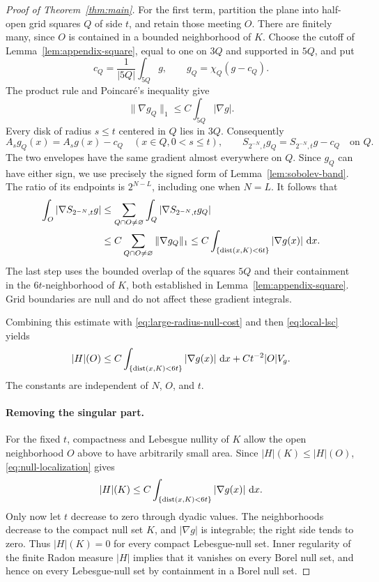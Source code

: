 \begin{proof}[Proof of Theorem~\ref{thm:main}]
For the first term, partition the plane into half-open grid squares
$Q$ of side $t$, and retain those meeting $O$. There are finitely
many, since $O$ is contained in a bounded neighborhood of $K$.
Choose the cutoff of Lemma~\ref{lem:appendix-square}, equal to one
on $3Q$ and supported in $5Q$, and put
\[
 c_Q=\frac1{|5Q|}\int_{5Q}g,\qquad
 g_Q=\chi_Q(g-c_Q).
\]
The product rule and Poincar\'e's inequality give
\begin{equation}\label{eq:localized-input}
 \|\nabla g_Q\|_1\le C\int_{5Q}|\nabla g|.
\end{equation}
Every disk of radius $s\le t$ centered in $Q$ lies in $3Q$.
Consequently
\[
 A_sg_Q(x)=A_sg(x)-c_Q\quad(x\in Q, 0<s\le t),
 \qquad
 S_{2^{-N},t}g_Q=S_{2^{-N},t}g-c_Q\quad\text{on }Q.
\]
The two envelopes have the same gradient almost everywhere on
$Q$. Since $g_Q$ can have either sign, we use precisely the signed
form of Lemma~\ref{lem:sobolev-band}. The ratio of its endpoints
is $2^{N-L}$, including one when $N=L$. It follows that
\begin{align*}
 \int_O|\nabla S_{2^{-N},t}g|
 &\le\sum_{Q\cap O\ne\varnothing}
                \int_Q|\nabla S_{2^{-N},t}g_Q|\\
 &\le C\sum_{Q\cap O\ne\varnothing}\|\nabla g_Q\|_1
 \le C\int_{\{\operatorname{dist}(x,K)<6t\}}|\nabla g(x)|\,\mathop{}\!\mathrm{d} x.
\end{align*}
The last step uses the bounded overlap of the squares $5Q$ and
their containment in the $6t$-neighborhood of $K$, both established
in Lemma~\ref{lem:appendix-square}. Grid boundaries are null and
do not affect these gradient integrals.

Combining this estimate with \eqref{eq:large-radius-null-cost}
and then \eqref{eq:local-lsc} yields
\begin{equation}\label{eq:null-localization}
 |H|(O)\le C\int_{\{\operatorname{dist}(x,K)<6t\}}|\nabla g(x)|\,\mathop{}\!\mathrm{d} x
                  +C t^{-2}|O|V_g.
\end{equation}
The constants are independent of $N$, $O$, and $t$.

\paragraph{Removing the singular part.}
For the fixed $t$, compactness and Lebesgue nullity of $K$ allow
the open neighborhood $O$ above to have arbitrarily small area.
Since $|H|(K)\le|H|(O)$, \eqref{eq:null-localization} gives
\[
 |H|(K)\le C\int_{\{\operatorname{dist}(x,K)<6t\}}|\nabla g(x)|\,\mathop{}\!\mathrm{d} x.
\]
Only now let $t$ decrease to zero through dyadic values. The
neighborhoods decrease to the compact null set $K$, and
$|\nabla g|$ is integrable; the right side tends to zero.
Thus $|H|(K)=0$ for every compact Lebesgue-null set. Inner
regularity of the finite Radon measure $|H|$ implies that it
vanishes on every Borel null set, and hence on every Lebesgue-null
set by containment in a Borel null set.


\end{proof}

